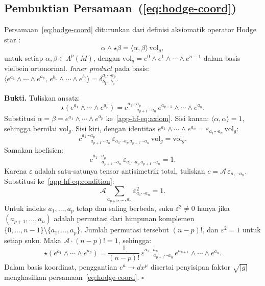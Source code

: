 \subsection{Pembuktian Persamaan~(\ref{eq:hodge-coord})}
\label{app:proof-hodge-formula}
 
Persamaan~\eqref{eq:hodge-coord} diturunkan dari definisi aksiomatik operator Hodge star \cite{nakahara2003geometry, eguchi1980}:
\begin{equation}\label{app-hf-eq:axiom}
    \alpha \wedge \star\beta = \langle\alpha,\beta\rangle\,\mathrm{vol}_g,
\end{equation}
untuk setiap $\alpha, \beta \in \Lambda^p(M)$, dengan $\mathrm{vol}_g = e^0 \wedge e^1 \wedge \cdots \wedge e^{n-1}$ dalam basis vielbein ortonormal. \textit{Inner product} pada basis: $\langle e^{a_1} \wedge \cdots \wedge e^{a_p},\, e^{b_1} \wedge \cdots \wedge e^{b_p}\rangle = \delta^{a_1 \cdots a_p}_{b_1 \cdots b_p}$.
 
\bigskip\noindent\textbf{Bukti.} Tuliskan ansatz:
\begin{equation}
    \star(e^{a_1} \wedge \cdots \wedge e^{a_p}) = c^{a_1 \cdots a_p}_{\ \ \ \ \ \ \ \ a_{p+1} \cdots a_n}\,e^{a_{p+1}} \wedge \cdots \wedge e^{a_n}.
\end{equation}
Substitusi $\alpha = \beta = e^{a_1} \wedge \cdots \wedge e^{a_p}$ ke~\eqref{app-hf-eq:axiom}. Sisi kanan: $\langle\alpha,\alpha\rangle = 1$, sehingga bernilai $\mathrm{vol}_g$. Sisi kiri, dengan identitas $e^{a_1} \wedge \cdots \wedge e^{a_n} = \varepsilon_{a_1 \cdots a_n}\,\mathrm{vol}_g$:
\begin{equation}
    c^{a_1 \cdots a_p}_{\ \ \ \ \ \ \ \ a_{p+1} \cdots a_n}\,\varepsilon_{a_1 \cdots a_p\, a_{p+1} \cdots a_n}\,\mathrm{vol}_g = \mathrm{vol}_g.
\end{equation}
Samakan koefisien:
\begin{equation}\label{app-hf-eq:condition}
    c^{a_1 \cdots a_p}_{\ \ \ \ \ \ \ \ a_{p+1} \cdots a_n}\,\varepsilon_{a_1 \cdots a_p\, a_{p+1} \cdots a_n} = 1.
\end{equation}
Karena $\varepsilon$ adalah satu-satunya tensor antisimetrik total, tuliskan $c = \mathcal{A}\,\varepsilon_{a_1 \cdots a_n}$. Substitusi ke~\eqref{app-hf-eq:condition}:
\begin{equation}
    \mathcal{A}\sum_{a_{p+1},\ldots,a_n} \varepsilon_{a_1 \cdots a_n}^2 = 1.
\end{equation}
Untuk indeks $a_1, \ldots, a_p$ tetap dan saling berbeda, suku $\varepsilon^2 \neq 0$ hanya jika $(a_{p+1}, \ldots, a_n)$ adalah permutasi dari himpunan komplemen $\{0,\ldots,n-1\} \setminus \{a_1,\ldots,a_p\}$. Jumlah permutasi tersebut $(n-p)!$, dan $\varepsilon^2 = 1$ untuk setiap suku. Maka $\mathcal{A} \cdot (n-p)! = 1$, sehingga:
\begin{equation}
    \star(e^{a_1} \wedge \cdots \wedge e^{a_p}) = \frac{1}{(n-p)!}\,\varepsilon^{a_1 \cdots a_p}_{\ \ \ \ \ \ \ \ a_{p+1} \cdots a_n}\,e^{a_{p+1}} \wedge \cdots \wedge e^{a_n}.
\end{equation}
Dalam basis koordinat, penggantian $e^a \to dx^\mu$ disertai penyisipan faktor $\sqrt{|g|}$ menghasilkan persamaan~\eqref{eq:hodge-coord}. $\square$
 
